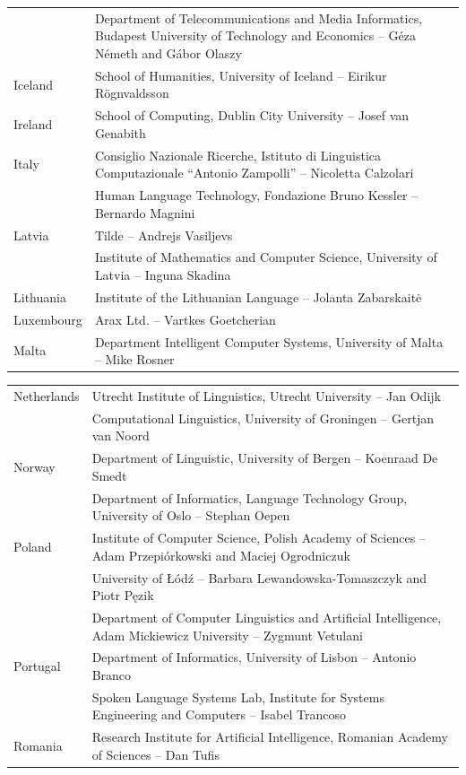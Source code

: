 \documentclass[]{../../metanetpaper}
\begin{document}
\begin{Parallel}[c]{80mm}{80mm}
\begin{tabular*}{\textwidth}{lp{13.5cm}}
  & Department of Telecommunications and Media Informatics, Budapest University of Technology and Economics -- Géza Németh and Gábor Olaszy\\
  Iceland & School of Humanities, University of Iceland -- Eirikur Rögnvaldsson\\
  Ireland & School of Computing, Dublin City University -- Josef van Genabith\\
  Italy & Consiglio Nazionale Ricerche, Istituto di Linguistica Computazionale “Antonio Zampolli” -- Nicoletta Calzolari\\
  & Human Language Technology, Fondazione Bruno Kessler -- Bernardo Magnini\\
  Latvia & Tilde -- Andrejs Vasiljevs\\
  & Institute of Mathematics and Computer Science, University of Latvia -- Inguna Skadina\\
  Lithuania & Institute of the Lithuanian Language -- Jolanta Zabarskaitė\\
  Luxembourg & Arax Ltd. -- Vartkes Goetcherian\\
  Malta & Department Intelligent Computer Systems, University of Malta -- Mike Rosner\\
\end{tabular*}
\begin{tabular*}{\textwidth}{lp{13.5cm}}
  Netherlands & Utrecht Institute of Linguistics, Utrecht University -- Jan Odijk\\
  & Computational Linguistics, University of Groningen -- Gertjan van Noord\\
  Norway & Department of Linguistic, University of Bergen -- Koenraad De Smedt\\
  & Department of Informatics, Language Technology Group, University of Oslo -- Stephan Oepen \\
  Poland & Institute of Computer Science, Polish Academy of Sciences -- Adam Przepiórkowski and Maciej Ogrodniczuk \\
  & University of Łódź -- Barbara Lewandowska-Tomaszczyk and Piotr Pęzik\\
  & Department of Computer Linguistics and Artificial Intelligence, Adam Mickiewicz University -- Zygmunt Vetulani \\
  Portugal & Department of Informatics, University of Lisbon -- Antonio Branco\\
  & Spoken Language Systems Lab, Institute for Systems Engineering and Computers -- Isabel Trancoso \\
  Romania & Research Institute for Artificial Intelligence, Romanian Academy of Sciences -- Dan Tufis \\

\end{tabular*}
\end{Parallel}
\end{document}
